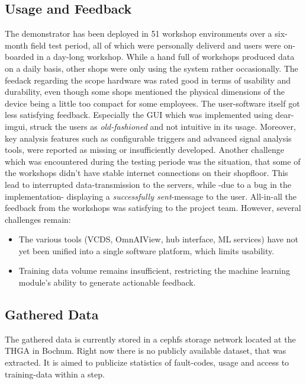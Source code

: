 \subsection{Usage and Feedback}
The demonstrator has been deployed in 51 workshop environments over a six-month field test period, 
all of which were personally deliverd and users were on-boarded in a day-long workshop.
While a hand full of workshops produced data on a daily basis, other shops were only using the system rather occasionally. 
The feedack regarding the scope hardware was rated good in terms of usability and durability, even though some shops mentioned the physical dimensions of the device being a little too compact for some employees.
The user-software itself got less satisfying feedback. 
Especially the GUI which was implemented using dear-imgui, struck the users as \textit{old-fashioned} and not intuitive in its usage.
Moreover, key analysis features such as configurable triggers and advanced signal analysis tools, were reported as missing or insufficiently developed.
Another challenge which was encountered during the testing periode was the situation, that some of the workshops didn't have stable internet connections on their shopfloor.
This lead to interrupted data-transmission to the servers, while -due to a bug in the implementation- displaying a \textit{successfully sent}-message to the user.
All-in-all the feedback from the workshops was satisfying to the project team.
However, several challenges remain:
\begin{itemize}
  \item The various tools (VCDS, OmnAIView, hub interface, ML services) have not yet been unified into a single software platform, which limits usability.
  \item Training data volume remains insufficient, restricting the machine learning module’s ability to generate actionable feedback.
\end{itemize}

\subsection{Gathered Data}
The gathered data is currently stored in a cephfs storage network located at the THGA in Bochum.
Right now there is no publicly available dataset, that was extracted.
It is aimed to publicize statistics of fault-codes, usage and access to training-data within a step. 

